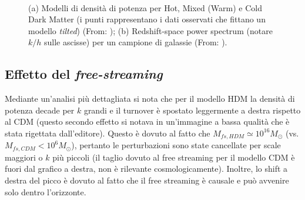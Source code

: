 \begin{figure}[H]
    $\;\;$
    \caption{(a) Modelli di densità di potenza per Hot, Mixed (Warm) e Cold Dark Matter (i punti rappresentano i dati osservati che fittano un modello \textit{tilted}) (From: \cite{1998hep.ph...10362K}); (b) Redshift-space power spectrum (notare $k/h$ sulle ascisse) per un campione di galassie (From: \cite{percival2006shape}).} \label{fig8:bella3} 
\end{figure}


\subsection{Effetto del \textit{free-streaming}}
Mediante un'analisi più dettagliata si nota che per il modello HDM la densità di potenza decade per $k$ grandi e il turnover è spostato leggermente a destra rispetto al CDM (questo secondo effetto si notava in un'immagine a bassa qualità che è stata rigettata dall'editore). Questo è dovuto al fatto che $M_{fs, HDM}\simeq 10^{16}M_\odot$ (vs. $M_{fs, CDM}< 10^{6}M_\odot$), pertanto le perturbazioni sono state cancellate per scale maggiori o $k$ più piccoli (il taglio dovuto al free streaming per il modello CDM è fuori dal grafico a destra, non è rilevante cosmologicamente). Inoltre, lo shift a destra del picco è dovuto al fatto che il free streaming è causale e può avvenire solo dentro l'orizzonte. 

